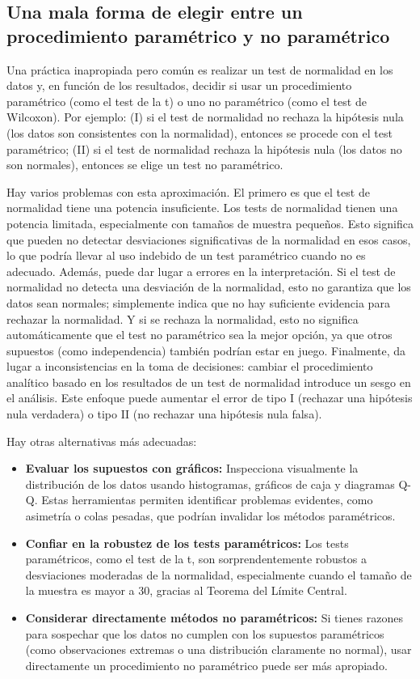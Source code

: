 \documentclass{config/apuntes}\usepackage[]{graphicx}\usepackage[]{xcolor}
\begin{document}
\subsection{Una mala forma de elegir entre un procedimiento paramétrico y no paramétrico}
Una práctica inapropiada pero común es realizar un test de normalidad en los datos y, en función de los resultados, decidir si usar un procedimiento paramétrico (como el test de la t) o uno no paramétrico (como el test de Wilcoxon). Por ejemplo: (I) si el test de normalidad no rechaza la hipótesis nula (los datos son consistentes con la normalidad), entonces se procede con el test paramétrico; (II) si el test de normalidad rechaza la hipótesis nula (los datos no son normales), entonces se elige un test no paramétrico.

Hay varios problemas con esta aproximación. El primero es que el test de normalidad tiene una potencia insuficiente. Los tests de normalidad tienen una potencia limitada, especialmente con tamaños de muestra pequeños. Esto significa que pueden no detectar desviaciones significativas de la normalidad en esos casos, lo que podría llevar al uso indebido de un test paramétrico cuando no es adecuado.
Además, puede dar lugar a errores en la interpretación. Si el test de normalidad no detecta una desviación de la normalidad, esto no garantiza que los datos sean normales; simplemente indica que no hay suficiente evidencia para rechazar la normalidad. Y si se rechaza la normalidad, esto no significa automáticamente que el test no paramétrico sea la mejor opción, ya que otros supuestos (como independencia) también podrían estar en juego.
Finalmente, da lugar a inconsistencias en la toma de decisiones: cambiar el procedimiento analítico basado en los resultados de un test de normalidad introduce un sesgo en el análisis. Este enfoque puede aumentar el error de tipo I (rechazar una hipótesis nula verdadera) o tipo II (no rechazar una hipótesis nula falsa).

Hay otras alternativas más adecuadas:
\begin{itemize}
\item \textbf{Evaluar los supuestos con gráficos:} Inspecciona visualmente la distribución de los datos usando histogramas, gráficos de caja y diagramas Q-Q. Estas herramientas permiten identificar problemas evidentes, como asimetría o colas pesadas, que podrían invalidar los métodos paramétricos.
\item \textbf{Confiar en la robustez de los tests paramétricos:} Los tests paramétricos, como el test de la t, son sorprendentemente robustos a desviaciones moderadas de la normalidad, especialmente cuando el tamaño de la muestra es mayor a 30, gracias al Teorema del Límite Central.
\item \textbf{Considerar directamente métodos no paramétricos:} Si tienes razones para sospechar que los datos no cumplen con los supuestos paramétricos (como observaciones extremas o una distribución claramente no normal), usar directamente un procedimiento no paramétrico puede ser más apropiado.
\end{itemize}
\end{document}
